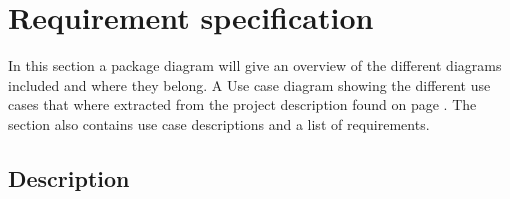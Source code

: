 \section{Requirement specification}
In this section a package diagram will give an overview of the different diagrams included and where they belong. A Use case diagram showing the different use cases that where extracted from the project description found on page \pageref{sc:problemdescription}. The section also contains use case descriptions and a list of requirements.
\subsection{Description}

\noindent{}





